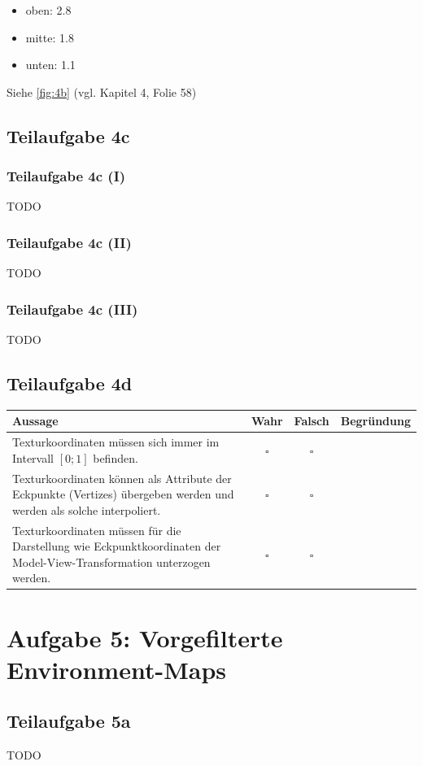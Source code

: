 \documentclass[a4paper]{scrartcl}
\begin{document}
\begin{itemize}
    \item oben: 2.8
    \item mitte: 1.8
    \item unten: 1.1
\end{itemize}

Siehe \cref{fig:4b} (vgl. Kapitel 4, Folie 58)

\subsection*{Teilaufgabe 4c}
\subsubsection*{Teilaufgabe 4c (I)}
TODO
\subsubsection*{Teilaufgabe 4c (II)}
TODO
\subsubsection*{Teilaufgabe 4c (III)}
TODO

\subsection*{Teilaufgabe 4d}
\begin{tabular}{p{6cm}ccp{5cm}}\toprule
Aussage  & Wahr & Falsch & Begründung \\\midrule
Texturkoordinaten müssen sich immer im Intervall $[0; 1]$ befinden. & $\square$ & $\square$ & ~ \\
Texturkoordinaten können als Attribute der Eckpunkte (Vertizes) übergeben werden und werden als solche interpoliert.  & $\square$    & $\square$      & ~          \\
Texturkoordinaten müssen für die Darstellung wie Eckpunktkoordinaten der Model-View-Transformation unterzogen werden. & $\square$    & $\square$      & ~          \\\bottomrule
\end{tabular}


\section*{Aufgabe 5: Vorgefilterte Environment-Maps}
\subsection*{Teilaufgabe 5a}
TODO
\end{document}
